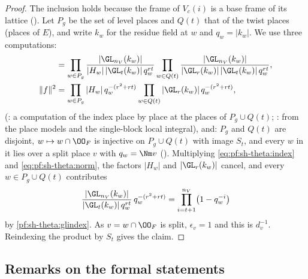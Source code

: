 \begin{proof}
The inclusion holds because the frame of $V_c(i)$ is a base frame of its lattice
(). Let $P_g$ be the set of level places and $Q(t)$ that of the
twist places (places of $E$), and write $k_w$ for the residue field at $w$ and $q_w=|k_w|$. We use three computations:
\begin{align}
[K_\Lambda:K_{\mathrm{lev}}]&=\prod_{w\in P_g}\frac{|\GL_{n_V}(k_w)|}{|H_w|\,|\GL_t(k_w)|\,q_w^{rt}}
\prod_{w\in Q(t)}\frac{|\GL_{n_V}(k_w)|}{|\GL_r(k_w)|\,|\GL_t(k_w)|\,q_w^{rt}},\label{eq:pf:sh-theta:index}\\
\|f\|^2&=\prod_{w\in P_g}|H_w|\,q_w^{-(r^2+rt)}\prod_{w\in Q(t)}|\GL_r(k_w)|\,q_w^{-(r^2+rt)},\label{eq:pf:sh-theta:norm}
\end{align}
(: a computation of the index place by place at the places
of $P_g\cup Q(t)$; : from the place models and the single-block
local integral), and: $P_g$ and $Q(t)$ are disjoint, $w\mapsto w\cap\OO_F$ is
injective on $P_g\cup Q(t)$ with image $S_t$, and every $w$ in it lies over a split place $v$ with $q_w=\Nm v$
(). Multiplying \eqref{eq:pf:sh-theta:index} and
\eqref{eq:pf:sh-theta:norm}, the factors $|H_w|$ and $|\GL_r(k_w)|$ cancel, and every $w\in P_g\cup Q(t)$ contributes
\[
\frac{|\GL_{n_V}(k_w)|}{|\GL_t(k_w)|\,q_w^{rt}}\,q_w^{-(r^2+rt)}=\prod_{i=t+1}^{n_V}\bigl(1-q_w^{-i}\bigr)
\]
by \cref{pf:sh-theta:glindex}. As $v=w\cap\OO_F$ is split, $\epsilon_v=1$ and this is $d_v^{-1}$. Reindexing the product by
$S_t$ gives the claim.
\end{proof}

\subsection{Remarks on the formal statements}\label{sec:pf:sh-theta:remarks}

